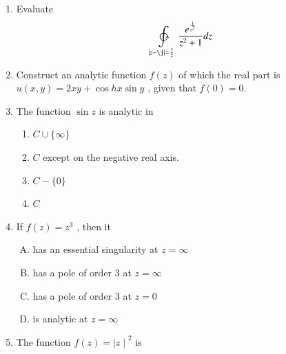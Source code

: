 \documentclass[journal,12pt,twocolumn]{IEEEtran}
\begin{document}
\begin{enumerate}[1.]
\item Evaluate 
\begin{equation}
\ointctrclockwise\limits_{\abs{z-\j}=\frac{7}{2}} \frac{e^{\frac{1}{z^2}}}{z^2+1}dz
\end{equation}


\item Construct an analytic function $f(z)$ of which the real part is
$u(x,y)=2xy+ \cos hx \sin y $ , given that $f(0)=0$.

\item The function $ \sin z$ is analytic in

\begin{enumerate}

\item $
C \cup \lbrace \infty \rbrace
$

\item 
$C$ except on the negative real axis.

\item $
C-\lbrace 0 \rbrace
$

\item $
C
$

\end{enumerate}
                                                                                                                                                                        
\item If $f(z)=z^3$ , then it

\begin{enumerate}[(A)]

\item 
has an essential singularity at $z=\infty$

\item 
has a pole of order $3$ at $z=\infty$

\item 
has a pole of order $3$ at $z=0$

\item 
is analytic at $z=\infty$

\end{enumerate}

\item The function $f(z) = {\mid z \mid}^2 $ is


\begin{enumerate}


\end{enumerate}
\end{enumerate}
\end{document}
